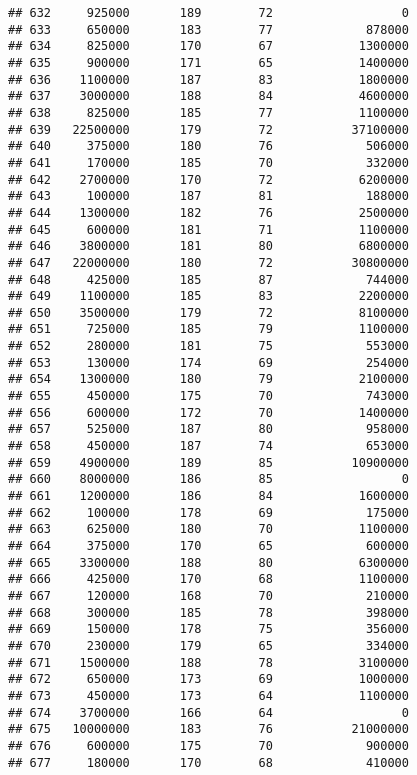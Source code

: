 \documentclass[
]{article}
\begin{document}
\begin{verbatim}
## 632     925000       189        72                  0
## 633     650000       183        77             878000
## 634     825000       170        67            1300000
## 635     900000       171        65            1400000
## 636    1100000       187        83            1800000
## 637    3000000       188        84            4600000
## 638     825000       185        77            1100000
## 639   22500000       179        72           37100000
## 640     375000       180        76             506000
## 641     170000       185        70             332000
## 642    2700000       170        72            6200000
## 643     100000       187        81             188000
## 644    1300000       182        76            2500000
## 645     600000       181        71            1100000
## 646    3800000       181        80            6800000
## 647   22000000       180        72           30800000
## 648     425000       185        87             744000
## 649    1100000       185        83            2200000
## 650    3500000       179        72            8100000
## 651     725000       185        79            1100000
## 652     280000       181        75             553000
## 653     130000       174        69             254000
## 654    1300000       180        79            2100000
## 655     450000       175        70             743000
## 656     600000       172        70            1400000
## 657     525000       187        80             958000
## 658     450000       187        74             653000
## 659    4900000       189        85           10900000
## 660    8000000       186        85                  0
## 661    1200000       186        84            1600000
## 662     100000       178        69             175000
## 663     625000       180        70            1100000
## 664     375000       170        65             600000
## 665    3300000       188        80            6300000
## 666     425000       170        68            1100000
## 667     120000       168        70             210000
## 668     300000       185        78             398000
## 669     150000       178        75             356000
## 670     230000       179        65             334000
## 671    1500000       188        78            3100000
## 672     650000       173        69            1000000
## 673     450000       173        64            1100000
## 674    3700000       166        64                  0
## 675   10000000       183        76           21000000
## 676     600000       175        70             900000
## 677     180000       170        68             410000

\end{verbatim}
\end{document}
